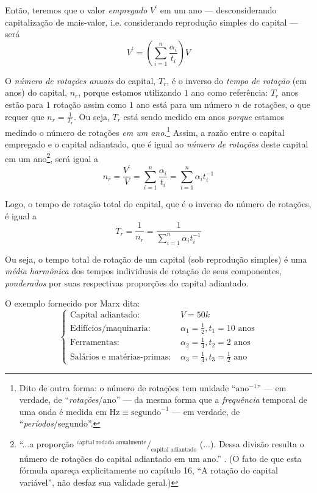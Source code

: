 Então, teremos que o valor \textit{empregado} $V^\prime$ em um ano --- desconsiderando capitalização de mais-valor, i.e. considerando reprodução simples do capital --- será
$$
V^\prime = \left( \sum \limits_{i=1}^{n} \frac{\alpha_{i}}{t_{i}} \right) V
$$

O \textit{número de rotações anuais} do capital, $T_r$, é o inverso do \textit{tempo de rotação} (em anos) do capital, $n_r$, porque estamos utilizando $1$ ano como referência: $T_r$ anos estão para $1$ rotação assim como $1$ ano está para um número $n$ de rotações, o que requer que $n_r=\frac{1}{T_r}$. Ou seja, $T_r$ está sendo medido em anos \textit{porque} estamos medindo o número de rotações \textit{em um ano}.\footnote{Dito de outra forma: o número de rotações tem unidade ``$\text{ano}^{-1}$'' — em verdade, de ``\textit{rotações}/ano'' — da mesma forma que a \textit{frequência} temporal de uma onda é medida em $\text{Hz}\equiv \text{segundo}^{-1}$ --- em verdade, de ``\textit{períodos}/segundo''.} Assim, a razão entre o capital empregado e o capital adiantado, que é igual ao \textit{número de rotações} deste capital em um ano\footnote{``...a proporção $^\text{capital rodado anualmente}/_{\text{capital adiantado}}$ (...). Dessa divisão resulta o número de rotações do capital adiantado em um ano.'' \parencite[p. 399]{Marx2014}. (O fato de que esta fórmula apareça explicitamente no capítulo 16, ``A rotação do capital variável'', não desfaz sua validade geral.)}, será igual a
$$
n_r = \frac{V^\prime}{V} = \sum \limits_{i=1}^{n} \frac{\alpha_{i}}{t_{i}} = \sum \limits_{i=1}^{n} \alpha_{i} t_{i}^{-1}
$$

Logo, o tempo de rotação total do capital, que é o inverso do número de rotações, é igual a
$$
T_r = \frac{1}{n_r} = \frac{1}{\sum \limits_{i=1}^{n} \alpha_{i} t_{i}^{-1}}
$$

Ou seja, o tempo total de rotação de um capital (sob reprodução simples) é uma \textit{média harmônica} dos tempos individuais de rotação de seus componentes, \textit{ponderados} por suas respectivas proporções do capital adiantado.

O exemplo fornecido por Marx \parencite[p. 270-1]{Marx2014} dita:
$$
\begin{cases}
\text{Capital adiantado}: &V = 50k\\
\text{Edifícios/maquinaria: }&\alpha_{1}=\frac{1}{2}, t_{1}=10 \text{ anos} \\
\text{Ferramentas: }&\alpha_{2}=\frac{1}{4}, t_{2}=2 \text{ anos}\\
\text{Salários e matérias-primas: }&\alpha_{3}=\frac{1}{4}, t_{3}=\frac{1}{2} \text{ ano}
\end{cases}
$$

